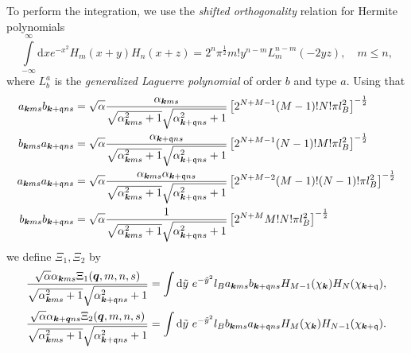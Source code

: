 To perform the integration, we use the \emph{shifted orthogonality} relation for Hermite polynomials~\cite[Eq. (7.377)]{gradshteinTableIntegralsSeries2015}
\begin{equation}
  \label{eq:hermite-shift-ortho}
  \int\limits_{-\infty }^{\infty } \mathrm{d}x
  e^{-x^2} H_m(x+y) H_n(x+z)
  = 2^n \pi^{\frac{1}{2}} m! y^{n-m} L^{n-m}_m(-2yz), \quad m\leq n,
\end{equation}
where \(L^{a}_{b}\) is the \emph{generalized Laguerre polynomial} of order \(b\) and type \(a\).
Using that
\begin{align}
  a_{\bm{k} m s} b_{\bm{k} +\mathfrak{q} ns}
  &=
    \sqrt{\alpha } \frac{\alpha_{\bm{k} m s}}{\sqrt{\alpha _{\bm{k} m s} ^2 + 1} \sqrt{\alpha _{\bm{k} + \mathfrak{q} ns} ^2  + 1}  }
    \left[
    2^{N+M-1} (M-1)! N! \pi l_{B}^2
    \right  ]^{-\frac{1}{2}}\\
  b_{\bm{k} m s} a_{\bm{k} +\mathfrak{q} ns}
  &=
    \sqrt{\alpha } \frac{\alpha_{\bm{k} + \mathfrak{q} n s}}{\sqrt{\alpha _{\bm{k} m s} ^2 + 1} \sqrt{\alpha _{\bm{k} + \mathfrak{q} ns} ^2  + 1}  }
    \left[
    2^{N+M-1} (N-1)! M! \pi l_{B}^2
    \right  ]^{-\frac{1}{2}}\\
  a_{\bm{k} m s} a_{\bm{k} +\mathfrak{q} ns}
  &=
    \sqrt{\alpha } \frac{\alpha_{\bm{k} m s} \alpha_{\bm{k} + \mathfrak{q} n s}}{
    \sqrt{\alpha _{\bm{k} m s} ^2 + 1} \sqrt{\alpha _{\bm{k} + \mathfrak{q} ns} ^2  + 1}
    }
    \left[
    2^{N+M-2} (M-1)! (N-1)! \pi l_{B}^2
    \right  ]^{-\frac{1}{2}}\\
  b_{\bm{k} m s} b_{\bm{k} +\mathfrak{q} ns}
  &=
    \sqrt{\alpha } \frac{1}{
    \sqrt{\alpha _{\bm{k} m s} ^2 + 1} \sqrt{\alpha _{\bm{k} + \mathfrak{q} ns} ^2  + 1}
    }
    \left[
    2^{N+M} M! N! \pi l_{B}^2
    \right  ]^{-\frac{1}{2}}
\end{align}
we define \( \Xi_1, \Xi_2 \) by
\begin{align}
  \label{eq:81}
  \frac{ \sqrt{\alpha } \alpha _{\bm{k} m s} \Xi_1 ( \bm{q}, m, n, s )}{
    \sqrt{\alpha _{\bm{k} m s}^2 + 1}
    \sqrt{\alpha _{\bm{k} + \mathfrak{q} n s} ^2 + 1}
  }
  &=
  \int \mathrm{d} \tilde{y}
  ~e^{-\tilde{y}^2}
  l_{B}
  a_{\bm{k} m s} b_{\bm{k} + \mathfrak{q} ns}
  H_{M-1} (\chi_{\bm{k}})
  H_N ( \chi _{\bm{k} + \mathfrak{q}} ),\\
  \label{eq:82}
  \frac{ \sqrt{\alpha } \alpha _{\bm{k} + \bm{q} n s} \Xi_2 ( \bm{q}, m, n, s )}{
    \sqrt{\alpha _{\bm{k} m s}^2 + 1}
    \sqrt{\alpha _{\bm{k} + \mathfrak{q} n s} ^2 + 1}
  }
  &=
  \int \mathrm{d} \tilde{y}
  ~e^{-\tilde{y}^2}
  l_{B}
  b_{\bm{k} m s} a_{\bm{k} + \mathfrak{q} ns}
  H_{M} (\chi_{\bm{k}})
  H_{N-1} ( \chi _{\bm{k} + \mathfrak{q}} ).
\end{align}
